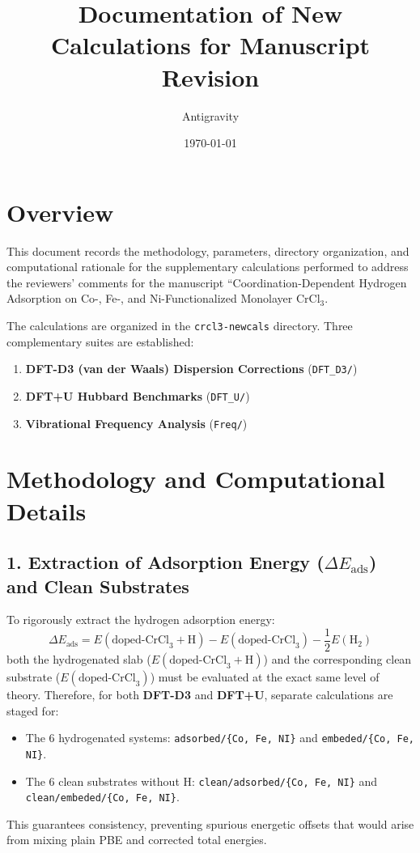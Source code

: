 \documentclass[11pt]{article}
\title{Documentation of New Calculations for Manuscript Revision}
\author{Antigravity}
\date{\today}
\begin{document}
\maketitle

\section{Overview}
This document records the methodology, parameters, directory organization, and computational rationale for the supplementary calculations performed to address the reviewers' comments for the manuscript ``Coordination-Dependent Hydrogen Adsorption on Co-, Fe-, and Ni-Functionalized Monolayer $\text{CrCl}_3$.

The calculations are organized in the \texttt{crcl3-newcals} directory. Three complementary suites are established:
\begin{enumerate}
    \item \textbf{DFT-D3 (van der Waals) Dispersion Corrections} (\texttt{DFT\_D3/})
    \item \textbf{DFT+U Hubbard Benchmarks} (\texttt{DFT\_U/})
    \item \textbf{Vibrational Frequency Analysis} (\texttt{Freq/})
\end{enumerate}

\section{Methodology and Computational Details}

\subsection{1. Extraction of Adsorption Energy ($\Delta E_{\mathrm{ads}}$) and Clean Substrates}
To rigorously extract the hydrogen adsorption energy:
\begin{equation}
    \Delta E_{\mathrm{ads}} = E(\text{doped-CrCl}_3 + \text{H}) - E(\text{doped-CrCl}_3) - \frac{1}{2} E(\text{H}_2)
\end{equation}
both the hydrogenated slab ($E(\text{doped-CrCl}_3 + \text{H})$) and the corresponding clean substrate ($E(\text{doped-CrCl}_3)$) must be evaluated at the exact same level of theory. Therefore, for both \textbf{DFT-D3} and \textbf{DFT+U}, separate calculations are staged for:
\begin{itemize}
    \item The 6 hydrogenated systems: \texttt{adsorbed/\{Co, Fe, NI\}} and \texttt{embeded/\{Co, Fe, NI\}}.
    \item The 6 clean substrates without H: \texttt{clean/adsorbed/\{Co, Fe, NI\}} and \texttt{clean/embeded/\{Co, Fe, NI\}}.
\end{itemize}
This guarantees consistency, preventing spurious energetic offsets that would arise from mixing plain PBE and corrected total energies.
\end{document}
